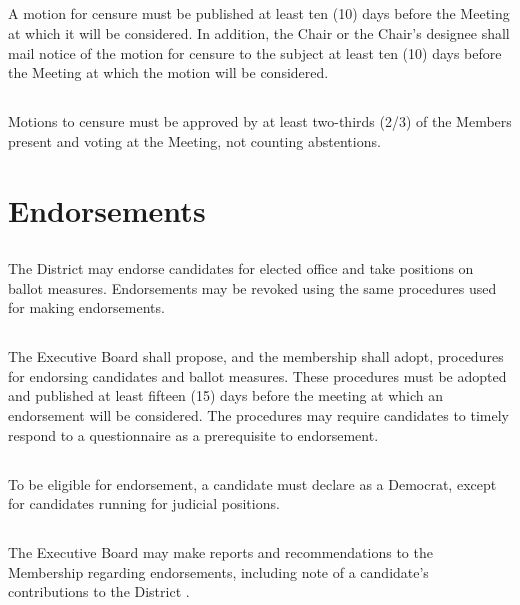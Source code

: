 \subsection{}
A motion for censure must be published at least ten (10) days before the Meeting at which it will be considered. In addition, the Chair or the Chair’s designee shall mail notice of the motion for censure to the subject at least ten (10) days before the Meeting at which the motion will be considered.

\subsection{}
Motions to censure must be approved by at least two-thirds (2/3) of the Members present and voting at the Meeting, not counting abstentions.

\section{Endorsements}
\subsection{}
The \fortythird{} District  may endorse candidates for elected office and take positions on ballot measures.  Endorsements may be revoked using the same procedures used for making endorsements.

\subsection{} \label{endorsement-procedures}
The Executive Board shall propose, and the membership shall adopt, procedures for endorsing candidates and ballot measures. These procedures must be adopted and published at least fifteen (15) days before the meeting at which an endorsement will be considered. The procedures may require candidates to timely respond to a questionnaire as a prerequisite to endorsement.

\subsection{}
To be eligible for endorsement, a candidate must declare as a Democrat, except for candidates running for judicial positions.

\subsection{}
The Executive Board may make reports and recommendations to the Membership regarding endorsements, including note of a candidate’s contributions to the \fortythird{} District .

